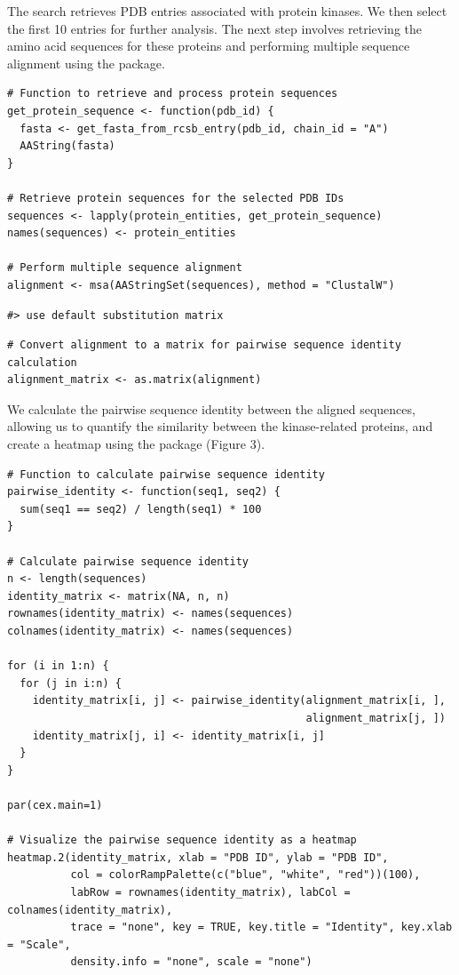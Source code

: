 The search retrieves PDB entries associated with protein kinases. We then select the first 10 entries for further analysis. The next step involves retrieving the amino acid sequences for these proteins and performing multiple sequence alignment using the  package.

\begin{verbatim}
# Function to retrieve and process protein sequences
get_protein_sequence <- function(pdb_id) {
  fasta <- get_fasta_from_rcsb_entry(pdb_id, chain_id = "A")
  AAString(fasta)
}

# Retrieve protein sequences for the selected PDB IDs
sequences <- lapply(protein_entities, get_protein_sequence)
names(sequences) <- protein_entities

# Perform multiple sequence alignment
alignment <- msa(AAStringSet(sequences), method = "ClustalW")
\end{verbatim}

\begin{verbatim}
#> use default substitution matrix
\end{verbatim}

\begin{verbatim}
# Convert alignment to a matrix for pairwise sequence identity calculation
alignment_matrix <- as.matrix(alignment)
\end{verbatim}

We calculate the pairwise sequence identity between the aligned sequences, allowing us to quantify the similarity between the kinase-related proteins, and create a heatmap using the  package (Figure 3).

\begin{verbatim}
# Function to calculate pairwise sequence identity
pairwise_identity <- function(seq1, seq2) {
  sum(seq1 == seq2) / length(seq1) * 100
}

# Calculate pairwise sequence identity
n <- length(sequences)
identity_matrix <- matrix(NA, n, n)
rownames(identity_matrix) <- names(sequences)
colnames(identity_matrix) <- names(sequences)

for (i in 1:n) {
  for (j in i:n) {
    identity_matrix[i, j] <- pairwise_identity(alignment_matrix[i, ], 
                                               alignment_matrix[j, ])
    identity_matrix[j, i] <- identity_matrix[i, j]
  }
}

par(cex.main=1)

# Visualize the pairwise sequence identity as a heatmap
heatmap.2(identity_matrix, xlab = "PDB ID", ylab = "PDB ID", 
          col = colorRampPalette(c("blue", "white", "red"))(100),
          labRow = rownames(identity_matrix), labCol = colnames(identity_matrix),
          trace = "none", key = TRUE, key.title = "Identity", key.xlab = "Scale", 
          density.info = "none", scale = "none")
\end{verbatim}

